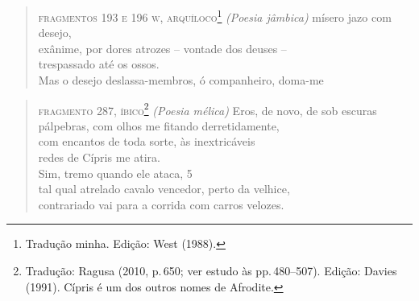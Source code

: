\smallskip

\begin{verse}
\small{\textsc{fragmentos 193 e 196 w, arquíloco}\footnote{Tradução minha. Edição: West (1988).}
\textit{(Poesia jâmbica)}
\smallskip
\hspace*{4.5em}mísero jazo com desejo,\\
\hspace*{2em}exânime, por dores atrozes -- vontade dos deuses --\\
\hspace*{4.5em}trespassado até os ossos.\\

Mas o desejo deslassa-membros, ó companheiro, doma-me}
\end{verse}

\smallskip
\begin{verse}
\small{\textsc{fragmento 287, íbico}\footnote{Tradução: Ragusa (2010, p.\,650; ver estudo às pp.\,480--507). Edição: Davies (1991). Cípris é um dos outros nomes de Afrodite.}
\textit{(Poesia mélica)}
\smallskip
Eros, de novo, de sob escuras\\
pálpebras, com olhos me fitando derretidamente,\\ 
com encantos de toda sorte, às inextricáveis\\
redes de Cípris me atira.\\ %

Sim, tremo quando ele ataca, \num{5}\\
tal qual atrelado cavalo vencedor, perto da velhice,\\
contrariado vai para a corrida com carros velozes.}
\end{verse}

